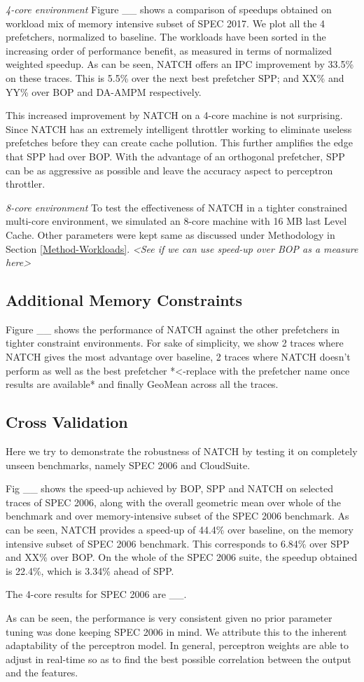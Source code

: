 \textit{4-core environment} Figure \_\_ shows a comparison of speedups
obtained on workload mix of memory intensive subset of SPEC 2017.  We
plot all the 4 prefetchers, normalized to baseline.  The workloads
have been sorted in the increasing order of performance benefit, as
measured in terms of normalized weighted speedup.  As can be seen,
NATCH offers an IPC improvement by 33.5\% on these traces.  This is
5.5\% over the next best prefetcher SPP; and XX\% and YY\% over BOP
and DA-AMPM respectively.

This increased improvement by NATCH on a 4-core machine is not
surprising.  Since NATCH has an extremely intelligent throttler
working to eliminate useless prefetches before they can create cache
pollution.  This further amplifies the edge that SPP had over BOP.
With the advantage of an orthogonal prefetcher, SPP can be as
aggressive as possible and leave the accuracy aspect to perceptron
throttler.

\textit{8-core environment} To test the effectiveness of NATCH in a
tighter constrained multi-core environment, we simulated an 8-core
machine with 16 MB last Level Cache.  Other parameters were kept same
as discussed under Methodology in Section \ref{Method-Workloads}.  
\textit{<See if we can use
speed-up over BOP as a measure here>}

\subsection{Additional Memory Constraints}
\label{Results-AdditionalMem}
Figure \_\_ shows the performance of NATCH against the other
prefetchers in tighter constraint environments.  For sake of
simplicity, we show 2 traces where NATCH gives the most advantage
over baseline, 2 traces where NATCH doesn't perform as well as the
best prefetcher *<-replace with the prefetcher name once results are
available* and finally GeoMean across all the traces.  

\subsection{Cross Validation}
\label{Results-CrossVal}
Here we try to demonstrate the robustness of NATCH by testing it on
completely unseen benchmarks, namely SPEC 2006 and CloudSuite.

Fig \_\_ shows the speed-up achieved by BOP, SPP and NATCH on
selected traces of SPEC 2006, along with the overall geometric mean
over whole of the benchmark and over memory-intensive subset of the
SPEC 2006 benchmark.  As can be seen, NATCH provides a speed-up of
44.4\% over baseline, on the memory intensive subset of SPEC 2006
benchmark.  This corresponds to 6.84\% over SPP and XX\% over BOP.  On
the whole of the SPEC 2006 suite, the speedup obtained is 22.4\%,
which is 3.34\% ahead of SPP.

The 4-core results for SPEC 2006 are \_\_.

As can be seen, the performance is very consistent given no prior
parameter tuning was done keeping SPEC 2006 in mind.  We attribute
this to the inherent adaptability of the perceptron model.  In
general, perceptron weights are able to adjust in real-time so as to
find the best possible correlation between the output and the
features.
